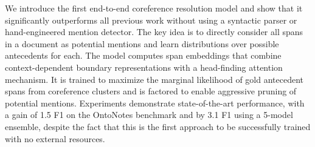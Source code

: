 We introduce the first end-to-end coreference resolution model and show that it significantly outperforms all previous work without using a syntactic parser or hand-engineered mention detector. The key idea is to directly consider all spans in a document as potential mentions and learn distributions over possible antecedents for each. The model computes span embeddings that combine context-dependent boundary representations with a head-finding attention mechanism. It is trained to maximize the marginal likelihood of gold antecedent spans from coreference clusters and is factored to enable aggressive pruning of potential mentions. Experiments demonstrate state-of-the-art performance, with a gain of 1.5 F1 on the OntoNotes benchmark and by 3.1 F1 using a 5-model ensemble, despite the fact that this is the first approach to be successfully trained with no external resources.
